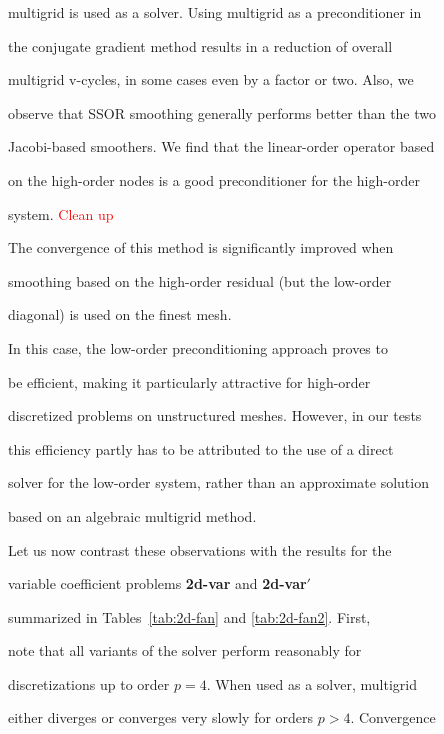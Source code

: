 \documentclass[smallcondensed,final]{svjour3}     %
\newcommand{\todo}[1]{\textcolor{red}{ #1}}
\begin{document}
multigrid is used as a solver. Using multigrid as a preconditioner in

the conjugate gradient method results in a reduction of overall

multigrid v-cycles, in some cases even by a factor or two. Also, we

observe that SSOR smoothing generally performs better than the two

Jacobi-based smoothers. We find that the linear-order operator based

on the high-order nodes is a good preconditioner for the high-order

system. \todo{Clean up}

 The convergence of this method is significantly improved when

smoothing based on the high-order residual (but the low-order

diagonal) is used on the finest mesh.





In this case, the low-order preconditioning approach proves to

be efficient, making it particularly attractive for high-order

discretized problems on unstructured meshes. However, in our tests

this efficiency partly has to be attributed to the use of a direct

solver for the low-order system, rather than an approximate solution

based on an algebraic multigrid method.



Let us now contrast these observations with the results for the

variable coefficient problems {\bf 2d-var} and {\bf 2d-var$'$}

summarized in Tables~\ref{tab:2d-fan} and \ref{tab:2d-fan2}. First,

note that all variants of the solver perform reasonably for

discretizations up to order $p=4$. When used as a solver, multigrid

either diverges or converges very slowly for orders $p>4$. Convergence
\end{document}
